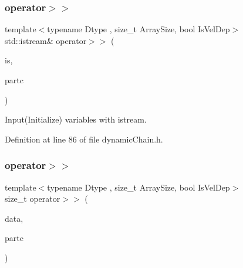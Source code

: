\subsubsection{\texorpdfstring{operator$>$$>$}{operator>>}\hspace{0.1cm}{\footnotesize\ttfamily [1/2]}}
{\footnotesize\ttfamily template$<$typename Dtype , size\+\_\+t Array\+Size, bool Is\+Vel\+Dep$>$ \\
std\+::istream\& operator$>$$>$ (\begin{DoxyParamCaption}\item[{std\+::istream \&}]{is,  }\item[{\mbox{\hyperlink{class_vel_indep_chain_particles}{Vel\+Indep\+Chain\+Particles}}$<$ Dtype, Array\+Size, Is\+Vel\+Dep $>$ \&}]{partc }\end{DoxyParamCaption})\hspace{0.3cm}{\ttfamily [friend]}}



Input(\+Initialize) variables with istream. 



Definition at line 86 of file dynamic\+Chain.\+h.

\mbox{\label{class_vel_indep_chain_particles_a14ddc76e4a83ec2a17c39487668ea348}} 
\subsubsection{\texorpdfstring{operator$>$$>$}{operator>>}\hspace{0.1cm}{\footnotesize\ttfamily [2/2]}}
{\footnotesize\ttfamily template$<$typename Dtype , size\+\_\+t Array\+Size, bool Is\+Vel\+Dep$>$ \\
size\+\_\+t operator$>$$>$ (\begin{DoxyParamCaption}\item[{\mbox{\hyperlink{class_vel_indep_particles_a6bba8ac3f941a144214037a27ccaa119}{Dyn\+Scalar\+Array}} \&}]{data,  }\item[{\mbox{\hyperlink{class_vel_indep_chain_particles}{Vel\+Indep\+Chain\+Particles}}$<$ Dtype, Array\+Size, Is\+Vel\+Dep $>$ \&}]{partc }\end{DoxyParamCaption})\hspace{0.3cm}{\ttfamily [friend]}}



